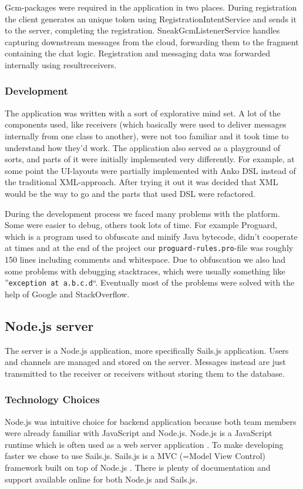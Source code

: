 Gcm-packages were required in the application in two places. During registration the client generates an unique token using RegistrationIntentService and sends it to the server, completing the registration. SneakGcmListenerService handles capturing downstream messages from the cloud, forwarding them to the fragment containing the chat logic. Registration and messaging data was forwarded internally using resultreceivers.

\subsubsection{Development}

The application was written with a sort of explorative mind set. A lot of the components used, like receivers (which basically were used to deliver messages internally from one class to another), were not too familiar and it took time to understand how they'd work. The application also served as a playground of sorts, and parts of it were initially implemented very differently. For example, at some point the UI-layouts were partially implemented with Anko DSL instead of the traditional XML-approach. After trying it out it was decided that XML would be the way to go and the parts that used DSL were refactored.

During the development process we faced many problems with the platform. Some were easier to debug, others took lots of time. For example Proguard, which is a program used to obfuscate and minify Java bytecode, didn't cooperate at times and at the end of the project our \verb|proguard-rules.pro|-file was roughly 150 lines including comments and whitespace. Due to obfuscation we also had some problems with debugging stacktraces, which were usually something like ''\verb|exception at a.b.c.d|``. Eventually most of the problems were solved with the help of Google and StackOverflow.

\subsection{Node.js server}
The server is a Node.js application, more specifically Sails.js application. Users and channels are managed and stored on the server. Messages instead are just transmitted to the receiver or receivers without storing them to the database. 

\subsubsection{Technology Choices}
Node.js was intuitive choice for backend application because both team members were already familiar with JavaScript and Node.js. Node.js is a JavaScript runtime which is often used as a web server application \cite{node}. To make developing faster we chose to use Sails.js. Sails.js is a MVC (=Model View Control) framework built on top of Node.js \cite{sails}. There is plenty of documentation and support available online for both Node.js and Sails.js.

